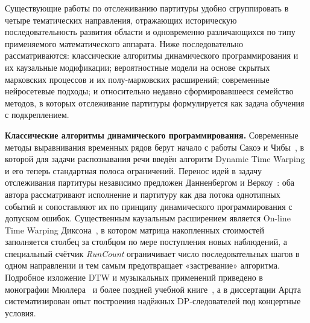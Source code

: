 %
Существующие работы по отслеживанию партитуры удобно сгруппировать
в четыре тематических направления, отражающих историческую
последовательность развития области и одновременно различающихся
по типу применяемого математического аппарата. Ниже последовательно
рассматриваются: классические алгоритмы динамического
программирования и их каузальные модификации; вероятностные
модели на основе скрытых марковских процессов и их полу-марковских
расширений; современные нейросетевые подходы; и относительно
недавно сформировавшееся семейство методов, в которых отслеживание
партитуры формулируется как задача обучения с подкреплением.

\textbf{Классические алгоритмы динамического программирования.}
Современные методы выравнивания временных рядов берут начало с
работы Сакоэ и Чибы~\cite{SakoeChiba1978}, в которой для задачи
распознавания речи введён алгоритм Dynamic Time Warping и его
теперь стандартная полоса ограничений. Перенос идей в задачу
отслеживания партитуры независимо предложен Данненбергом и
Веркоу~\cite{Dannenberg1984,Vercoe1984}: оба автора рассматривают
исполнение и партитуру как два потока однотипных событий и
сопоставляют их по принципу динамического программирования с
допуском ошибок. Существенным каузальным расширением
является On-line Time Warping
Диксона~\cite{Dixon2005}, в котором матрица накопленных
стоимостей заполняется столбец за столбцом по мере поступления
новых наблюдений, а специальный счётчик \textit{RunCount}
ограничивает число последовательных шагов в одном направлении и
тем самым предотвращает «застревание» алгоритма. Подробное
изложение DTW и музыкальных применений приведено в
монографии Мюллера~\cite{Mueller2007} и более поздней
учебной книге~\cite{MullerFMP2015}, а в диссертации
Арцта~\cite{Arzt2016} систематизирован опыт построения
надёжных DP-следователей под концертные условия.

